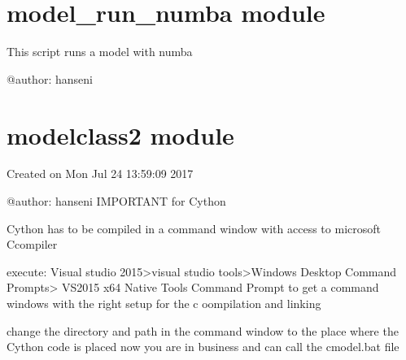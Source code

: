 \documentclass[letterpaper,10pt,english]{sphinxmanual}
\begin{document}
\sphinxstepscope


\section{model\_run\_numba module}
\label{\detokenize{unsorted/model_run_numba:module-model_run_numba}}\label{\detokenize{unsorted/model_run_numba:model-run-numba-module}}\label{\detokenize{unsorted/model_run_numba::doc}}
\sphinxAtStartPar
This script runs a model with numba

\sphinxAtStartPar
@author: hanseni

\sphinxstepscope


\section{modelclass2 module}
\label{\detokenize{unsorted/modelclass2:module-modelclass2}}\label{\detokenize{unsorted/modelclass2:modelclass2-module}}\label{\detokenize{unsorted/modelclass2::doc}}
\sphinxAtStartPar
Created on Mon Jul 24 13:59:09 2017

\sphinxAtStartPar
@author: hanseni
IMPORTANT for Cython

\sphinxAtStartPar
Cython has to be compiled in a command window with access to microsoft C\sphinxhyphen{}compiler

\sphinxAtStartPar
execute:
Visual studio 2015\textgreater{}visual studio tools\textgreater{}Windows Desktop Command Prompts\textgreater{} VS2015 x64 Native Tools Command Prompt
to get a command windows with the right setup for the c oompilation and linking

\sphinxAtStartPar
change the directory and path in the command window to the place where the Cython code is placed
now you are in business and can call the cmodel.bat file
\end{document}
